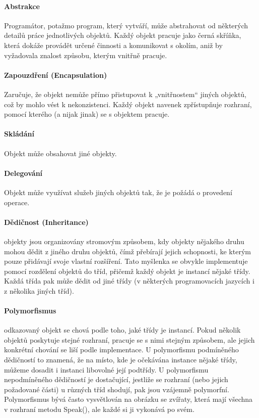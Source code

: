 \documentclass[10pt,a4paper]{article}
\begin{document}
\paragraph{Abstrakce} Programátor, potažmo program, který vytváří, může abstrahovat od některých detailů práce jednotlivých objektů. Každý objekt pracuje jako černá skříňka, která dokáže provádět určené činnosti a komunikovat s okolím, aniž by vyžadovala znalost způsobu, kterým vnitřně pracuje.

\paragraph{Zapouzdření (Encapsulation)}
Zaručuje, že objekt nemůže přímo přistupovat k „vnitřnostem“ jiných objektů, což by mohlo vést k nekonzistenci. Každý objekt navenek zpřístupňuje rozhraní, pomocí kterého (a nijak jinak) se s objektem pracuje.

\paragraph{Skládání}
Objekt může obsahovat jiné objekty.

\paragraph{Delegování}
Objekt může využívat služeb jiných objektů tak, že je požádá o provedení operace.

\paragraph{Dědičnost (Inheritance)}
objekty jsou organizovány stromovým způsobem, kdy objekty nějakého druhu mohou dědit z jiného druhu objektů, čímž přebírají jejich schopnosti, ke kterým pouze přidávají svoje vlastní rozšíření. Tato myšlenka se obvykle implementuje pomocí rozdělení objektů do tříd, přičemž každý objekt je instancí nějaké třídy. Každá třída pak může dědit od jiné třídy (v některých programovacích jazycích i z několika jiných tříd).

\paragraph{Polymorfismus}
odkazovaný objekt se chová podle toho, jaké třídy je instancí. Pokud několik objektů poskytuje stejné rozhraní, pracuje se s nimi stejným způsobem, ale jejich konkrétní chování se liší podle implementace. U polymorfismu podmíněného dědičností to znamená, že na místo, kde je očekávána instance nějaké třídy, můžeme dosadit i instanci libovolné její podtřídy. U polymorfismu nepodmíněného dědičností je dostačující, jestliže se rozhraní (nebo jejich požadované části) u různých tříd shodují, pak jsou vzájemně polymorfní. Polymorfismus bývá často vysvětlován na obrázku se zvířaty, která mají všechna v rozhraní metodu Speak(), ale každé si ji vykonává po svém. 
\end{document}
